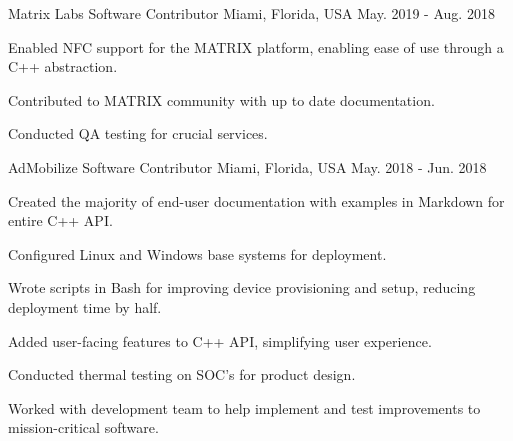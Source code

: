 

\begin{cventries}

  \cventry
    {Matrix Labs} %
    {Software Contributor} %
    {Miami, Florida, USA} %
    {May. 2019 - Aug. 2018} %
    {
      \begin{cvitems} %
        \item {Enabled NFC support for the MATRIX platform, enabling ease of use through a C++ abstraction.}
        \item {Contributed to MATRIX community with up to date documentation.}
        \item {Conducted QA testing for crucial services.}
      \end{cvitems}
    }


  \cventry
    {AdMobilize} %
    {Software Contributor} %
    {Miami, Florida, USA} %
    {May. 2018 - Jun. 2018} %
    {
      \begin{cvitems} %
        \item {Created the majority of end-user documentation with examples  in Markdown for entire C++ API.}
        \item {Configured Linux and Windows base systems for deployment.}
        \item {Wrote scripts in Bash for improving device provisioning and setup, reducing deployment time by half.}
        \item {Added user-facing features to C++ API, simplifying user experience.}
        \item {Conducted thermal testing on SOC's for product design.}
        \item {Worked with development team to help implement and test improvements to mission-critical software.}
      \end{cvitems}
    }


\end{cventries}
